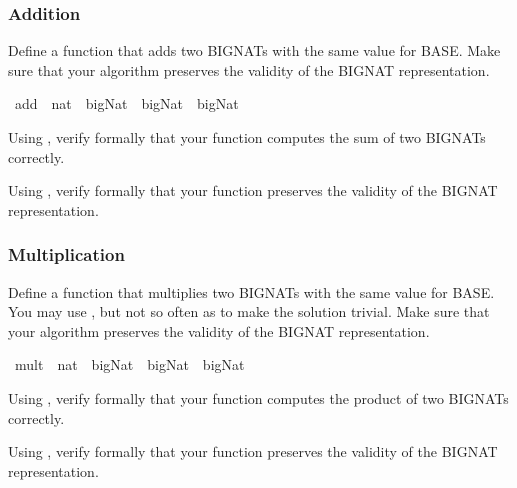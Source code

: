 \begin{isabellebody}
\begin{isamarkuptext}
\subsubsection*{Addition}%
\end{isamarkuptext}%
\isamarkuptrue%
%
\begin{isamarkuptext}%
Define a function  that adds two BIGNATs with the same value for BASE. Make sure that your algorithm preserves the validity of the BIGNAT representation.%
\end{isamarkuptext}%
\isamarkuptrue%
\ add\ {\isacharcolon}{\isacharcolon}\ {\isachardoublequote}nat\ {\isasymRightarrow}\ bigNat\ {\isasymRightarrow}\ bigNat\ {\isasymRightarrow}\ bigNat{\isachardoublequote}\isamarkupfalse%
%
\begin{isamarkuptext}%
Using , verify formally that your function  computes the sum of two BIGNATs correctly.%
\end{isamarkuptext}%
\isamarkuptrue%
%
\begin{isamarkuptext}%
Using , verify formally that your function  preserves the validity of the BIGNAT representation.%
\end{isamarkuptext}%
\isamarkuptrue%
%
\begin{isamarkuptext}%
\subsubsection*{Multiplication}%
\end{isamarkuptext}%
\isamarkuptrue%
%
\begin{isamarkuptext}%
Define a function  that multiplies two BIGNATs with the same value for BASE. You may use , but not so often as to make the solution trivial. Make sure that your algorithm preserves the validity of the BIGNAT representation.%
\end{isamarkuptext}%
\isamarkuptrue%
\ mult\ {\isacharcolon}{\isacharcolon}\ {\isachardoublequote}nat\ {\isasymRightarrow}\ bigNat\ {\isasymRightarrow}\ bigNat\ {\isasymRightarrow}\ bigNat{\isachardoublequote}\isamarkupfalse%
%
\begin{isamarkuptext}%
Using , verify formally that your function  computes the product of two BIGNATs correctly.%
\end{isamarkuptext}%
\isamarkuptrue%
%
\begin{isamarkuptext}%
Using , verify formally that your function  preserves the validity of the BIGNAT representation.%
\end{isamarkuptext}%
\isamarkuptrue%
\isanewline
\isanewline
\isanewline
\isanewline
\isamarkupfalse%
\end{isabellebody}%
